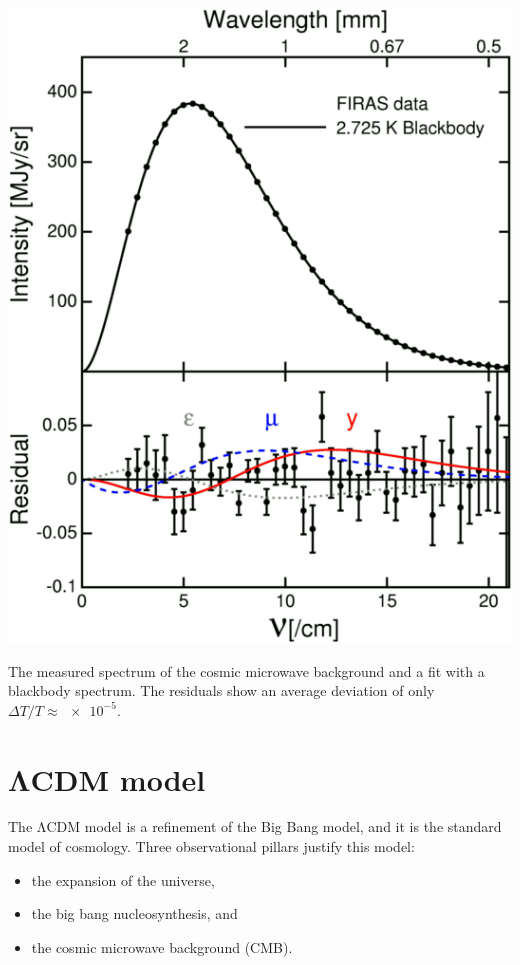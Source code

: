\begin{marginfigure}
	\centering
	\includegraphics[width=\textwidth]{img/ch-02/cmb.png}
	\caption{The measured spectrum of the cosmic microwave background and a fit with a blackbody spectrum. The residuals show an average deviation of only $\Delta T / T \approx \num{e-5}$.}
	\label{fig:cmb}
\end{marginfigure}




\section{ΛCDM model}


The ΛCDM model is a refinement of the Big Bang model, and it is the standard model of cosmology. Three observational pillars justify this model:
\begin{itemize}
	\item the expansion of the universe,
	\item the big bang nucleosynthesis, and
	\item the cosmic microwave background (CMB).
\end{itemize}

